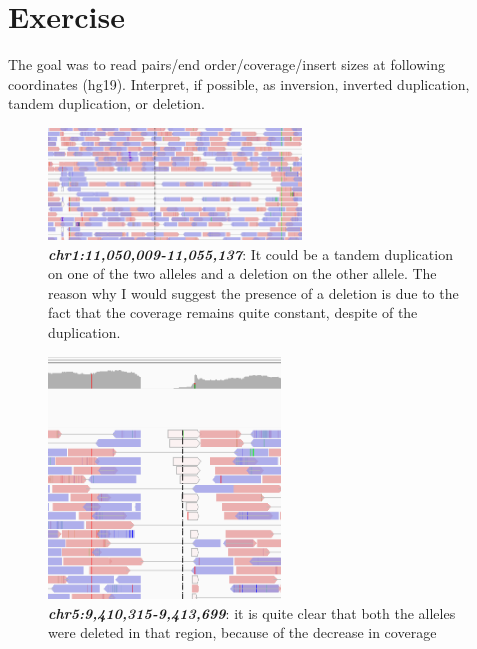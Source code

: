 \section{Exercise}

The goal was to read pairs/end order/coverage/insert sizes at following
coordinates (hg19). Interpret, if possible, as inversion, inverted duplication,
tandem duplication, or deletion.

\begin{figure}[H]
    \caption{\textit{\textbf{chr1:11,050,009-11,055,137}}: It could be a tandem duplication on one of the two alleles and a deletion on the other allele. The reason why I would suggest the presence of a deletion is due to the fact that the coverage remains quite constant, despite of the duplication.}
    \centering
    \includegraphics[width=0.6\textwidth]{pos1.PNG}
\end{figure}

\begin{figure}[H]
    \caption{\textbf{\textit{chr5:9,410,315-9,413,699}}: it is quite clear that both the alleles were deleted in that region, because of the decrease in coverage}
    \centering
    \includegraphics[width=0.55\textwidth]{pos2.PNG}
\end{figure}

